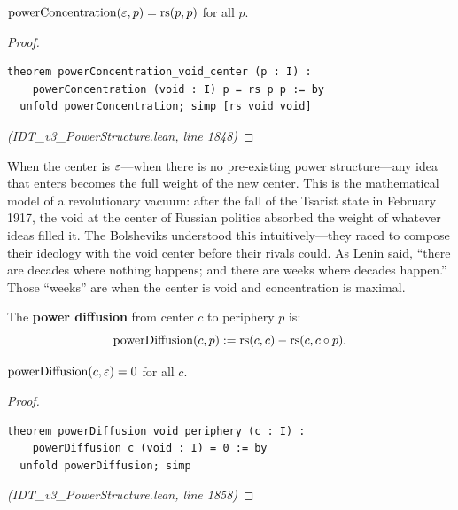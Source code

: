 \begin{theorem}
\label{thm:concentration-void}
$\mathrm{powerConcentration}(\varepsilon, p) = \mathrm{rs}(p, p)$ for all $p$.
\end{theorem}

\begin{proof}
\begin{lstlisting}
theorem powerConcentration_void_center (p : I) :
    powerConcentration (void : I) p = rs p p := by
  unfold powerConcentration; simp [rs_void_void]
\end{lstlisting}
\textit{(IDT\_v3\_PowerStructure.lean, line 1848)}
\end{proof}

\begin{interpretation}
When the center is $\varepsilon$---when there is no pre-existing power structure---any
idea that enters becomes the full weight of the new center. This is the
mathematical model of a revolutionary vacuum: after the fall of the Tsarist
state in February 1917, the void at the center of Russian politics absorbed
the weight of whatever ideas filled it. The Bolsheviks understood this
intuitively---they raced to compose their ideology with the void center
before their rivals could. As Lenin said, ``there are decades where nothing
happens; and there are weeks where decades happen.'' Those ``weeks'' are when
the center is void and concentration is maximal.
\end{interpretation}

\begin{definition}
\label{def:power-diffusion}
The \textbf{power diffusion} from center $c$ to periphery $p$ is:
\[
  \mathrm{powerDiffusion}(c, p) := \mathrm{rs}(c, c) - \mathrm{rs}(c, c \circ p).
\]
\end{definition}

\begin{theorem}
\label{thm:diffusion-void}
$\mathrm{powerDiffusion}(c, \varepsilon) = 0$ for all $c$.
\end{theorem}

\begin{proof}
\begin{lstlisting}
theorem powerDiffusion_void_periphery (c : I) :
    powerDiffusion c (void : I) = 0 := by
  unfold powerDiffusion; simp
\end{lstlisting}
\textit{(IDT\_v3\_PowerStructure.lean, line 1858)}
\end{proof}

